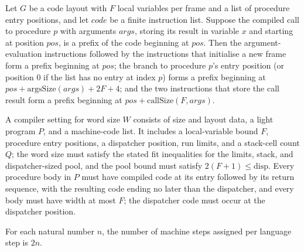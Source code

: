 \begin{theorem}
\label{Light.Compiler.codeAt_call}
\leanok
{}
Let $G$ be a code layout with $F$ local variables per frame and a list of procedure
entry positions, and let $code$ be a finite instruction list. Suppose the compiled call
to procedure $p$ with arguments $args$, storing its result in variable $x$ and starting
at position $pos$, is a prefix of the code beginning at $pos$. Then the
argument-evaluation instructions followed by the instructions that initialise a new
frame form a prefix beginning at $pos$; the branch to procedure $p$’s entry position (or
position $0$ if the list has no entry at index $p$) forms a prefix beginning at
$pos+\mathrm{argsSize}(args)+2F+4$; and the two instructions that store the call result
form a prefix beginning at $pos+\mathrm{callSize}(F,args)$.
\end{theorem}

\begin{definition}
\label{Light.Compiler.Setting}
\leanok
{}
A compiler setting for word size $W$ consists of size and layout data, a light program
$P$, and a machine-code list. It includes a local-variable bound $F$, procedure entry
positions, a dispatcher position, run limits, and a stack-cell count $Q$; the word size
must satisfy the stated fit inequalities for the limits, stack, and dispatcher-sized
pool, and the pool bound must satisfy $2(F+1)\leq\mathrm{disp}$. Every procedure body in
$P$ must have compiled code at its entry followed by its return sequence, with the
resulting code ending no later than the dispatcher, and every body must have width at
most $F$; the dispatcher code must occur at the dispatcher position.
\end{definition}

\begin{definition}
\label{Light.Compiler.stepsPerStep}
\leanok
For each natural number $n$, the number of machine steps assigned per language step is
$2n$.
\end{definition}


